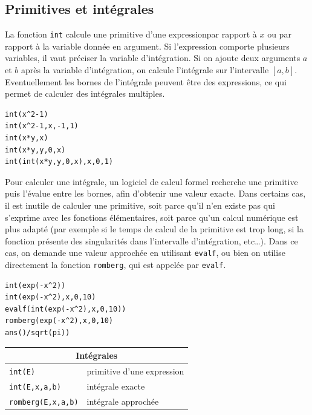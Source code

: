 \documentclass{article}
\begin{document}
\subsection{Primitives et int\'egrales}
%
La fonction \verb|int| calcule une primitive d'une expressionpar rapport \`a 
$x$ ou par rapport \`a la variable donn\'ee en argument. Si
l'expression comporte plusieurs variables, il vaut pr\'eciser la
variable d'int\'egration. Si on ajoute deux arguments $a$ et $b$ 
apr\`es la variable d'int\'egration, on calcule l'int\'egrale sur
l'intervalle $[a,b]$. Eventuellement les
bornes de l'int\'egrale peuvent \^etre des expressions, ce qui permet
de calculer des int\'egrales multiples.
\begin{verbatim}
int(x^2-1)
int(x^2-1,x,-1,1)
int(x*y,x)
int(x*y,y,0,x)
int(int(x*y,y,0,x),x,0,1)
\end{verbatim}
Pour calculer une int\'egrale, un logiciel de calcul formel recherche 
une primitive puis l'\'evalue entre les bornes, afin d'obtenir
une valeur exacte. Dans certains cas, il est inutile de calculer
une primitive, soit parce qu'il n'en existe pas qui s'exprime
avec les fonctions \'el\'ementaires, soit 
parce qu'un calcul num\'erique est plus adapt\'e (par exemple si 
le temps de calcul de la primitive est trop long, si la fonction
pr\'esente des singularit\'es dans l'intervalle d'int\'egration, etc\ldots).
Dans ce cas, on demande une valeur approch\'ee en utilisant
\verb|evalf|, ou bien on utilise directement 
la fonction \verb|romberg|, qui est
appel\'ee par \verb|evalf|.
\begin{verbatim}
int(exp(-x^2))
int(exp(-x^2),x,0,10)
evalf(int(exp(-x^2),x,0,10))
romberg(exp(-x^2),x,0,10)
ans()/sqrt(pi))
\end{verbatim}

\begin{center}
\begin{tabular}{|ll|}
\hline
\multicolumn{2}{|c|}{\bf Int\'egrales}\\
\hline\hline
\verb|int(E)| &primitive d'une expression\\
\verb|int(E,x,a,b)| & int\'egrale exacte\\
\verb|romberg(E,x,a,b)| & int\'egrale approch\'ee\\
\hline
\end{tabular}
\end{center}
%
\end{document}

